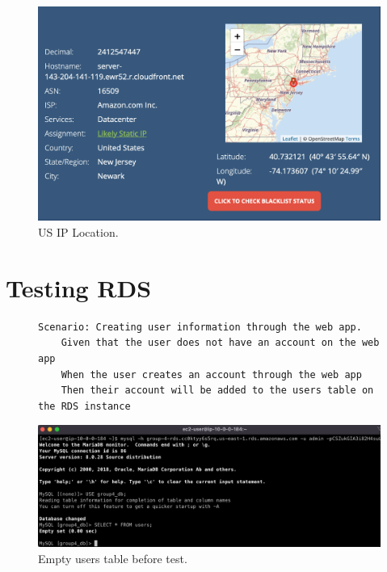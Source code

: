 \begin{figure}[!htbp]
    \centering
    \includegraphics[width=\textwidth]{resources/cloudfront/cloudfront-test-us-ip}
    \caption{US IP Location.}
    \label{fig:cloudfront-test-us-ip}
\end{figure}

\clearpage
\section{Testing RDS}\label{sec:testing-rds}
\begin{figure}[!htbp]
    \centering
    \begin{verbatim}
Scenario: Creating user information through the web app.
    Given that the user does not have an account on the web app
    When the user creates an account through the web app
    Then their account will be added to the users table on the RDS instance
    \end{verbatim}
    \label{fig:create-user-data}
\end{figure}

\begin{figure}[!htbp]
    \centering
    \includegraphics[width=\textwidth]{resources/rds/rds-testing-empty}
    \caption{Empty users table before test.}
    \label{fig:rds-testing-empty}
\end{figure}

